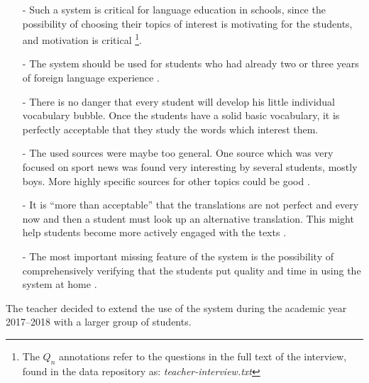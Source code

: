 \begin{itemize}

	\item [-] Such a system is critical for language education in schools, since the possibility of choosing their topics of interest is motivating for the students, and motivation is critical \footnote
		{The $Q_n$ annotations refer to the questions in the full text of the interview, found  in the data repository as: {\em teacher-interview.txt}}. 

	\item [-]The system should be used for students who had already two or three years of foreign language experience . 

	\item [-]There is no danger that every student will develop his little individual vocabulary bubble. Once the students have a solid basic vocabulary, it is perfectly acceptable that they study the words which interest them. 

	\item [-]The used sources were maybe too general. One source which was very focused on sport news was found very interesting by several students, mostly boys. More highly specific sources for other topics could be good .



	\item [-] It is ``more than acceptable'' that the translations are not perfect and every now and then a student must look up an alternative translation. This might help students become more actively engaged with the texts . 


	\item [-]The most important missing feature of the system is the possibility of comprehensively verifying that the students put quality and time in using the system at home .

\end{itemize}


The teacher decided to extend the use of the system during the academic year 2017--2018 with a larger group of students. 
